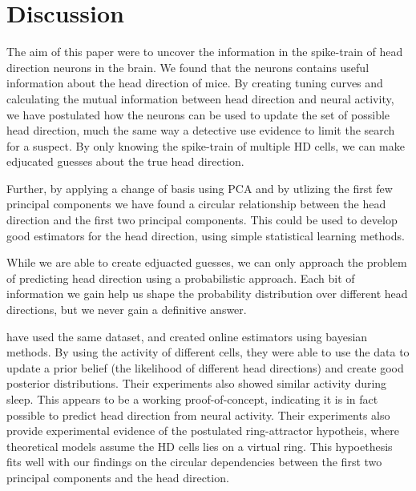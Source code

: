 \section{Discussion}
The aim of this paper were to uncover the information in the spike-train of head direction neurons in the brain.
We found that the neurons contains useful information about the head direction of mice. By creating tuning curves and calculating the mutual information between head direction and neural activity, we have postulated how the neurons can be used to update the set of possible head direction, much the same way a detective use evidence to limit the search for a suspect. By only knowing the spike-train of multiple HD cells, we can make edjucated guesses about the true head direction.

Further, by applying a change of basis using PCA and by utlizing the first few principal components we have found a circular relationship between the head direction and the first two principal components. This could be used to develop good estimators for the head direction, using simple statistical learning methods.

While we are able to create edjuacted guesses, we can only approach the problem of predicting head direction using a probabilistic approach. Each bit of information we gain help us shape the probability distribution over different head directions, but we never gain a definitive answer. 


\cite{projectdata} have used the same dataset, and created online estimators using bayesian methods. By using the activity of different cells, they were able to use the data to update a prior belief (the likelihood of different head directions) and create good posterior distributions. Their experiments also showed similar activity during sleep. This appears to be a working proof-of-concept, indicating it is in fact possible to predict head direction from neural activity. Their experiments also provide experimental evidence of the postulated ring-attractor hypotheis, where theoretical models assume the HD cells lies on a virtual ring. This hypoethesis fits well with our findings on the circular dependencies between the first two principal components and the head direction.  

